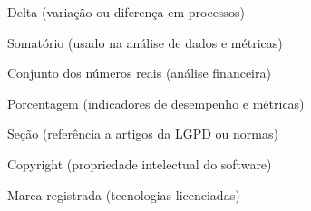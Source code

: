 \begin{simbolos}
  \item [$\Delta$] Delta (variação ou diferença em processos)
  \item [$\sum$] Somatório (usado na análise de dados e métricas)
  \item [$\mathbb{R}$] Conjunto dos números reais (análise financeira)
  \item [$\%$] Porcentagem (indicadores de desempenho e métricas)
  \item [$\S$] Seção (referência a artigos da LGPD ou normas)
  \item [$\copyright$] Copyright (propriedade intelectual do software)
  \item [$\registered$] Marca registrada (tecnologias licenciadas)
\end{simbolos}